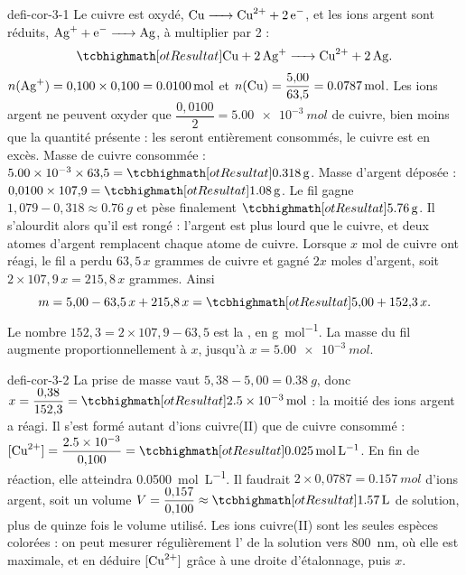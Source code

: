 \begin{blocEdition}{defi-cor-3-1}
Le cuivre est oxydé, $\ce{Cu -> Cu^{2+} + 2e-}$, et les ions argent sont réduits, $\ce{Ag+ + e- -> Ag}$, à multiplier par 2 :
\[\res{\ce{Cu + 2Ag+ -> Cu^{2+} + 2Ag}}.\]
$n(\ce{Ag+})=0{,}100\times0{,}100=\qty{0,0100}{mol}$ et $n(\ce{Cu})=\dfrac{5{,}00}{63{,}5}=\qty{0,0787}{mol}$. Les ions argent ne peuvent
oxyder que $\dfrac{0{,}0100}{2}=\qty{5,00e-3}{mol}$ de cuivre, bien moins que la quantité présente : les  seront
entièrement consommés, le cuivre est en excès.
Masse de cuivre consommée : $\num{5.00e-3}\times63{,}5=\res{\qty{0,318}{g}}$. Masse d'argent déposée : $0{,}0100\times107{,}9=\res{\qty{1,08}{g}}$.
Le fil gagne $1{,}079-0{,}318\approx\qty{0,76}{g}$ et pèse finalement $\res{\qty{5,76}{g}}$. Il s'alourdit alors qu'il est rongé :
l'argent est plus lourd que le cuivre, et deux atomes d'argent remplacent chaque atome de cuivre.
Lorsque $x$ mol de cuivre ont réagi, le fil a perdu $63{,}5\,x$ grammes de cuivre et gagné $2x$ moles d'argent, soit
$2\times107{,}9\,x=215{,}8\,x$ grammes. Ainsi
\[m=5{,}00-63{,}5\,x+215{,}8\,x=\res{5{,}00+152{,}3\,x}.\]
Le nombre $152{,}3=2\times107{,}9-63{,}5$ est la , en \unit{g.mol^{-1}}. La
masse du fil augmente proportionnellement à $x$, jusqu'à $x=\qty{5,00e-3}{mol}$.
\end{blocEdition}

\begin{blocEdition}{defi-cor-3-2}
\label{figedition-defi-cor-3-2-1}
La prise de masse vaut $5{,}38-5{,}00=\qty{0,38}{g}$, donc $x=\dfrac{0{,}38}{152{,}3}=\res{\qty{2,5e-3}{mol}}$ : la moitié des ions argent a réagi.
Il s'est formé autant d'ions cuivre(II) que de cuivre consommé : $[\ce{Cu^{2+}}]=\dfrac{\num{2.5e-3}}{0{,}100}=\res{\qty{0,025}{mol.L^{-1}}}$. En fin
de réaction, elle atteindra \qty{0,0500}{mol.L^{-1}}.
Il faudrait $2\times0{,}0787=\qty{0,157}{mol}$ d'ions argent, soit un volume $V=\dfrac{0{,}157}{0{,}100}\approx\res{\qty{1,57}{L}}$ de solution,
plus de quinze fois le volume utilisé.
Les ions cuivre(II) sont les seules espèces colorées : on peut mesurer régulièrement l' de la solution
vers \qty{800}{nm}, où elle est maximale, et en déduire $[\ce{Cu^{2+}}]$ grâce à une droite d'étalonnage, puis $x$.
\end{blocEdition}

